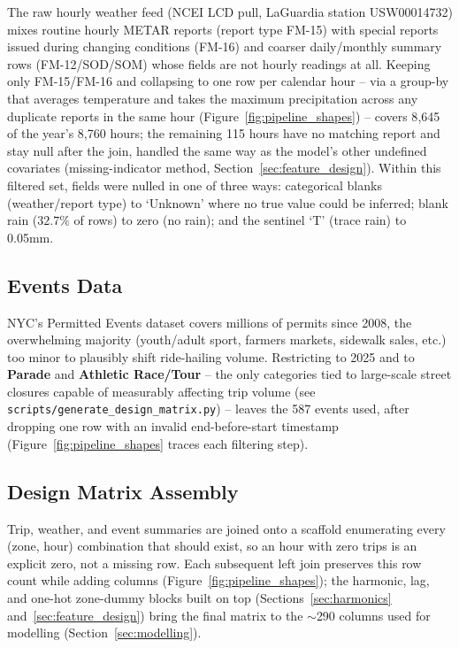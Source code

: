 \documentclass[11pt]{article}
\begin{document}
The raw hourly weather feed (NCEI LCD pull, LaGuardia station USW00014732) mixes routine hourly METAR reports (report type FM-15) with special reports issued during changing conditions (FM-16) and coarser daily/monthly summary rows (FM-12/SOD/SOM) whose fields are not hourly readings at all. Keeping only FM-15/FM-16 and collapsing to one row per calendar hour -- via a group-by that averages temperature and takes the maximum precipitation across any duplicate reports in the same hour (Figure~\ref{fig:pipeline_shapes}) -- covers 8{,}645 of the year's 8{,}760 hours; the remaining 115 hours have no matching report and stay null after the join, handled the same way as the model's other undefined covariates (missing-indicator method, Section~\ref{sec:feature_design}). Within this filtered set, fields were nulled in one of three ways: categorical blanks (weather/report type) to `Unknown' where no true value could be inferred; blank rain ($32.7\%$ of rows) to zero (no rain); and the sentinel `T' (trace rain) to 0.05mm.

\subsection{Events Data}

NYC's Permitted Events dataset covers millions of permits since 2008, the overwhelming majority (youth/adult sport, farmers markets, sidewalk sales, etc.) too minor to plausibly shift ride-hailing volume. Restricting to 2025 and to \textbf{Parade} and \textbf{Athletic Race/Tour} -- the only categories tied to large-scale street closures capable of measurably affecting trip volume (see \texttt{scripts/generate\_design\_matrix.py}) -- leaves the 587 events used, after dropping one row with an invalid end-before-start timestamp (Figure~\ref{fig:pipeline_shapes} traces each filtering step).

\subsection{Design Matrix Assembly}

Trip, weather, and event summaries are joined onto a scaffold enumerating every (zone, hour) combination that should exist, so an hour with zero trips is an explicit zero, not a missing row. Each subsequent left join preserves this row count while adding columns (Figure~\ref{fig:pipeline_shapes}); the harmonic, lag, and one-hot zone-dummy blocks built on top (Sections~\ref{sec:harmonics} and~\ref{sec:feature_design}) bring the final matrix to the $\sim$290 columns used for modelling (Section~\ref{sec:modelling}).
\end{document}
